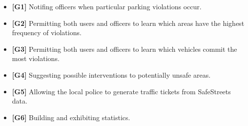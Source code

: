 \begin{itemize}

\item \textbf{[\hypertarget{G1}{G1}]} Notifing officers when particular parking violations occur.

\item \textbf{[\hypertarget{G2}{G2}]} Permitting both users and officers to learn which areas have the highest frequency of violations.

\item \textbf{[\hypertarget{G3}{G3}]} Permitting both users and officers to learn which vehicles commit the most violations.

\item \textbf{[\hypertarget{G4}{G4}]} Suggesting possible interventions to potentially unsafe areas.

\item \textbf{[\hypertarget{G5}{G5}]} Allowing the local police to generate traffic tickets from SafeStreets data.

\item \textbf{[\hypertarget{G6}{G6}]} Building and exhibiting statistics.

\end{itemize}